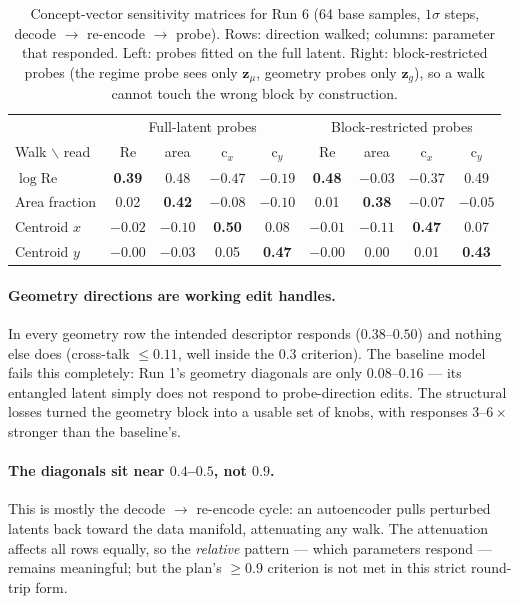 \documentclass[11pt]{article}
\begin{document}
\begin{table}[htbp]
  \centering
  \caption{Concept-vector sensitivity matrices for Run 6 (64 base
  samples, $1\sigma$ steps, decode $\to$ re-encode $\to$ probe). Rows:
  direction walked; columns: parameter that responded. Left: probes
  fitted on the full latent. Right: block-restricted probes (the regime
  probe sees only $\boldsymbol{z}_{\mu}$, geometry probes only
  $\boldsymbol{z}_{g}$), so a walk cannot touch the wrong block by
  construction.}
  \label{tab:concept}
  \begin{tabular}{lcccc|cccc}
    \toprule
    & \multicolumn{4}{c|}{Full-latent probes}
    & \multicolumn{4}{c}{Block-restricted probes} \\
    Walk $\backslash$ read & Re & area & c$_x$ & c$_y$
                           & Re & area & c$_x$ & c$_y$ \\
    \midrule
    $\log \mathrm{Re}$ & \textbf{0.39} & 0.48 & $-0.47$ & $-0.19$
                       & \textbf{0.48} & $-0.03$ & $-0.37$ & 0.49 \\
    Area fraction      & 0.02 & \textbf{0.42} & $-0.08$ & $-0.10$
                       & 0.01 & \textbf{0.38} & $-0.07$ & $-0.05$ \\
    Centroid $x$       & $-0.02$ & $-0.10$ & \textbf{0.50} & 0.08
                       & $-0.01$ & $-0.11$ & \textbf{0.47} & 0.07 \\
    Centroid $y$       & $-0.00$ & $-0.03$ & 0.05 & \textbf{0.47}
                       & $-0.00$ & 0.00 & 0.01 & \textbf{0.43} \\
    \bottomrule
  \end{tabular}
\end{table}

\paragraph{Geometry directions are working edit handles.} In every
geometry row the intended descriptor responds ($0.38$--$0.50$) and
nothing else does (cross-talk $\le 0.11$, well inside the $0.3$
criterion). The baseline model fails this completely: Run 1's geometry
diagonals are only $0.08$--$0.16$ --- its entangled latent simply does
not respond to probe-direction edits. The structural losses turned the
geometry block into a usable set of knobs, with responses $3$--$6\times$
stronger than the baseline's.

\paragraph{The diagonals sit near $0.4$--$0.5$, not $0.9$.} This is
mostly the decode $\to$ re-encode cycle: an autoencoder pulls perturbed
latents back toward the data manifold, attenuating any walk. The
attenuation affects all rows equally, so the \emph{relative} pattern ---
which parameters respond --- remains meaningful; but the plan's
$\ge 0.9$ criterion is not met in this strict round-trip form.
\end{document}
